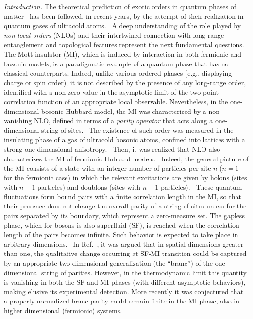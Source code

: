 \documentclass[aps,prb,floatfix,twocolumn,amsmath,amssymb]{revtex4}
\begin{document}
{\it Introduction.} The theoretical prediction of exotic orders in quantum phases of matter~\cite{Haldane1983,Affleck1987,Nijs1989} 
has been followed, in recent years, by the attempt of their realization in quantum gases of ultracold atoms.~\cite{Endres2011} 
A deep understanding of the role played by {\it non-local orders} (NLOs) and their intertwined connection with long-range 
entanglement and topological features represent the next fundamental questions.~\cite{Wenbook} The Mott insulator (MI), 
which is induced by interaction in both fermionic and bosonic models, is a paradigmatic example of a quantum phase that has no 
classical counterparts. Indeed, unlike various ordered phases (e.g., displaying charge or spin order), it is not described by 
the presence of any long-range order, identified with a non-zero value in the asymptotic limit of the two-point correlation 
function of an appropriate local observable. Nevertheless, in the one-dimensional bosonic Hubbard model, the MI was characterized by 
a non-vanishing NLO, defined in terms of a {\it parity operator} that acts along a one-dimensional string of sites.~\cite{Berg2008} 
The existence of such order was measured in the insulating phase of a gas of ultracold bosonic atoms, confined into lattices 
with a strong one-dimensional anisotropy.~\cite{Endres2011} Then, it was realized that NLO also characterizes the MI of fermionic 
Hubbard models.~\cite{Montorsi2012,Barbiero2013} Indeed, the general picture of the MI consists of a state with an integer number 
of particles per site $n$ ($n=1$ for the fermionic case) in which the relevant excitations are given by holons (sites with $n-1$ 
particles) and doublons (sites with $n+1$ particles).~\cite{NoteHD} These quantum fluctuations form bound pairs with a finite 
correlation length in the MI, so that their presence does not change the overall parity of a string of sites unless for the pairs 
separated by its boundary, which represent a zero-measure set. The gapless phase, which for bosons is also superfluid (SF), is 
reached when the correlation length of the pairs becomes infinite. Such behavior is expected to take place in arbitrary 
dimensions.~\cite{Capello2007,Capello2008} In Ref.~, it was argued that in spatial dimensions greater than 
one, the qualitative change occurring at SF-MI transition could be captured by an appropriate two-dimensional generalization 
(the ``brane'') of the one-dimensional string of parities. However, in the thermodynamic limit this quantity is vanishing in both 
the SF and MI phases (with different asymptotic behaviors), making elusive its experimental detection. More recently it was 
conjectured that a properly normalized brane parity could remain finite in the MI phase, also in higher dimensional (fermionic) 
systems.~\cite{Boschi2016}
\end{document}
